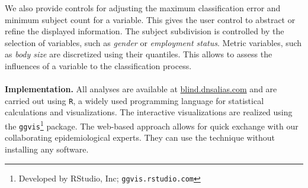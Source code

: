 \documentclass[a4paper,twoside]{style/article}
\begin{document}
We also provide controls for adjusting the maximum classification error and minimum subject count for a variable.
This gives the user control to abstract or refine the displayed information.
The subject subdivision is controlled by the selection of variables, such as \emph{gender} or \emph{employment status}.
Metric variables, such as \emph{body size} are discretized using their quantiles.
This allows to assess the influences of a variable to the classification process.
\\\\
\noindent \textbf{Implementation.}
All analyses are available at \url{blind.dnsalias.com} and are carried out using \texttt{R}, a widely used programming language for statistical calculations and visualizations.
The interactive visualizations are realized using the \texttt{ggvis}\footnote{Developed by RStudio, Inc; \texttt{ggvis.rstudio.com}} package.
The web-based approach allows for quick exchange with our collaborating epidemiological experts.
They can use the technique without installing any software.
\end{document}
